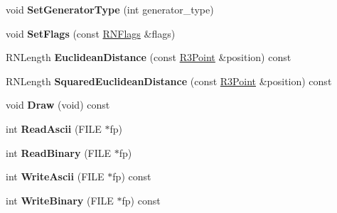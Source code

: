 \begin{DoxyCompactItemize}
\item 
void {\bfseries Set\+Generator\+Type} (int generator\+\_\+type)\hypertarget{struct_f_e_t_feature_a4ca913d36434bde64fff3a21f6ed2474}{}\label{struct_f_e_t_feature_a4ca913d36434bde64fff3a21f6ed2474}

\item 
void {\bfseries Set\+Flags} (const \hyperlink{class_r_n_flags}{R\+N\+Flags} \&flags)\hypertarget{struct_f_e_t_feature_ab550e55635fe67f917273e99d39fa46b}{}\label{struct_f_e_t_feature_ab550e55635fe67f917273e99d39fa46b}

\item 
R\+N\+Length {\bfseries Euclidean\+Distance} (const \hyperlink{class_r3_point}{R3\+Point} \&position) const \hypertarget{struct_f_e_t_feature_abb2820c3957cf4886a18ef741a0b3e29}{}\label{struct_f_e_t_feature_abb2820c3957cf4886a18ef741a0b3e29}

\item 
R\+N\+Length {\bfseries Squared\+Euclidean\+Distance} (const \hyperlink{class_r3_point}{R3\+Point} \&position) const \hypertarget{struct_f_e_t_feature_a9580b13a181f7a1fd2fab2681ae6ff18}{}\label{struct_f_e_t_feature_a9580b13a181f7a1fd2fab2681ae6ff18}

\item 
void {\bfseries Draw} (void) const \hypertarget{struct_f_e_t_feature_a8db435bf5ee8c2b7593ec7127f53f890}{}\label{struct_f_e_t_feature_a8db435bf5ee8c2b7593ec7127f53f890}

\item 
int {\bfseries Read\+Ascii} (F\+I\+LE $\ast$fp)\hypertarget{struct_f_e_t_feature_afe593b0d32b1a2f1578c8de5f9db644b}{}\label{struct_f_e_t_feature_afe593b0d32b1a2f1578c8de5f9db644b}

\item 
int {\bfseries Read\+Binary} (F\+I\+LE $\ast$fp)\hypertarget{struct_f_e_t_feature_a97191ec0ab32e6ea0e5a490de5d1b709}{}\label{struct_f_e_t_feature_a97191ec0ab32e6ea0e5a490de5d1b709}

\item 
int {\bfseries Write\+Ascii} (F\+I\+LE $\ast$fp) const \hypertarget{struct_f_e_t_feature_aa523cda969840fca0d70f36af39df7b2}{}\label{struct_f_e_t_feature_aa523cda969840fca0d70f36af39df7b2}

\item 
int {\bfseries Write\+Binary} (F\+I\+LE $\ast$fp) const \hypertarget{struct_f_e_t_feature_a9a1f9877d67f94a633ed78d397db38c6}{}\label{struct_f_e_t_feature_a9a1f9877d67f94a633ed78d397db38c6}


\end{DoxyCompactItemize}
